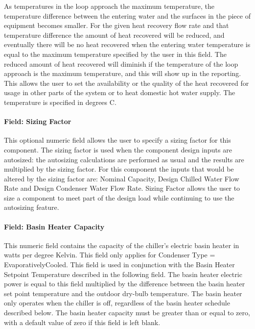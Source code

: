 As temperatures in the loop approach the maximum temperature, the temperature difference between the entering water and the surfaces in the piece of equipment becomes smaller. For the given heat recovery flow rate and that temperature difference the amount of heat recovered will be reduced, and eventually there will be no heat recovered when the entering water temperature is equal to the maximum temperature specified by the user in this field. The reduced amount of heat recovered will diminish if the temperature of the loop approach is the maximum temperature, and this will show up in the reporting. This allows the user to set the availability or the quality of the heat recovered for usage in other parts of the system or to heat domestic hot water supply. The temperature is specified in degrees C.

\paragraph{Field: Sizing Factor}\label{field-sizing-factor-6}

This optional numeric field allows the user to specify a sizing factor for this component. The sizing factor is used when the component design inputs are autosized: the autosizing calculations are performed as usual and the results are multiplied by the sizing factor. For this component the inputs that would be altered by the sizing factor are: Nominal Capacity, Design Chilled Water Flow Rate and Design Condenser Water Flow Rate. Sizing Factor allows the user to size a component to meet part of the design load while continuing to use the autosizing feature.

\paragraph{Field: Basin Heater Capacity}\label{field-basin-heater-capacity-3-001}

This numeric field contains the capacity of the chiller's electric basin heater in watts per degree Kelvin. This field only applies for Condenser Type = EvaporativelyCooled. This field is used in conjunction with the Basin Heater Setpoint Temperature described in the following field. The basin heater electric power is equal to this field multiplied by the difference between the basin heater set point temperature and the outdoor dry-bulb temperature. The basin heater only operates when the chiller is off, regardless of the basin heater schedule described below. The basin heater capacity must be greater than or equal to zero, with a default value of zero if this field is left blank.

